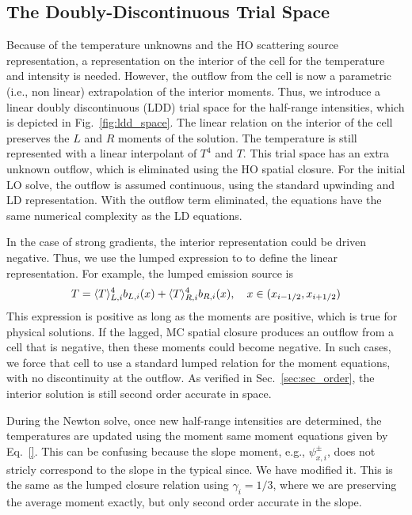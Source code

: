 \subsection{The Doubly-Discontinuous Trial Space}

Because of the temperature unknowns and the HO scattering source representation, a
representation on the interior of the cell for the temperature and intensity is needed.
However, the outflow from the cell is now a parametric (i.e., non linear)
extrapolation of the interior moments. Thus, we introduce a linear doubly
discontinuous (LDD) trial space for the half-range intensities, which is depicted in Fig.~\ref{fig:ldd_space}.
The linear relation on the interior of the cell preserves the $L$ and $R$ moments of the
solution.  The temperature is still represented with a linear interpolant of $T^4$ and
$T$.  
This trial space has an extra unknown outflow, which is eliminated using the HO spatial
closure.  For the initial LO solve, the outflow is assumed continuous, using the standard
upwinding and LD representation.  With the outflow term eliminated, the equations
have the same numerical complexity as the LD equations.   

In the case of strong gradients, the interior representation could be driven
negative.  Thus, we use the lumped expression to to define the linear representation.  For
example, the lumped emission source is
\begin{equation}
    T = \langle T \rangle_{L,i}^4 b_{L,i}(x) + \langle T \rangle_{R,i}^4 b_{R,i}(x) , \quad x\in({x_{i-1/2}},{x_{i+1/2}})
\end{equation}
This expression is positive as long as the moments are positive, which is true for
physical solutions.  If the lagged, MC spatial closure produces an outflow from a cell that is
negative, then these moments could become negative.  In such cases, we force that cell to
use a standard lumped relation for the moment equations, with no discontinuity at the
outflow.  As verified in Sec.~\ref{sec:sec_order}, the interior solution is still second
order accurate in space.

During the Newton solve, once new half-range
intensities are determined, the temperatures are updated using the moment same moment
equations given by Eq.~\eqref{}. This can be confusing because the slope moment,
e.g., $\psi_{x,i}^\pm$, does not stricly correspond to the slope in the typical since.
We have modified it.  This is the same as the lumped closure relation using
$\gamma_i=1/3$, where we are preserving the average moment exactly, but only second order
accurate in the slope.


